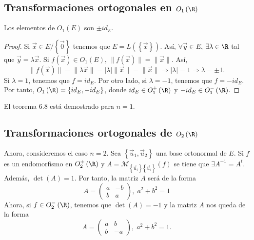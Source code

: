 \subsection{Transformaciones ortogonales en $\displaystyle O_{1}\left(\R\right) $}
\begin{ftheorem}[]
\normalfont Los elementos de $\displaystyle O_{1}\left(E\right) $ son $\displaystyle \pm id _{E} $.
\end{ftheorem}
\begin{proof}
Si $\displaystyle \vec{x} \in E/ \left\{ \vec{0}\right\}  $ tenemos que $\displaystyle E = L\left( \left\{ \vec{x}\right\} \right)$. Así, $\displaystyle \forall \vec{y} \in E $, $\displaystyle \exists \lambda \in \R $ tal que $\displaystyle \vec{y} = \lambda\vec{x} $. Si $\displaystyle f\left(\vec{x}\right) \in O_{1}\left(E\right) $, $\displaystyle \|f\left(\vec{x}\right)\| = \|\vec{x}\| $. Así,
	\[ \|f\left(\vec{x}\right)\| = \|\lambda \vec{x} \| = \left|\lambda \right|\|\vec{x}\| = \|\vec{x}\| \Rightarrow \left|\lambda \right|= 1 \Rightarrow \lambda = \pm 1 .\]
	Si $\displaystyle \lambda = 1 $, tenemos que $\displaystyle f = id _{E} $. Por otro lado, si $\displaystyle \lambda = - 1 $, tenemos que $\displaystyle f = - id _{E}$. Por tanto, $\displaystyle O_{1}\left(\R\right) = \left\{ id _{E}, - id _{E}\right\}  $, donde $\displaystyle id _{E} \in O^{+}_{1}\left(\R\right) $ y $\displaystyle -id _{E} \in O^{-}_{1}\left(\R\right) $.
\end{proof}
\begin{observation}
\normalfont El teorema 6.8 está demostrado para $\displaystyle n = 1 $.
\end{observation}
\subsection{Transformaciones ortogonales de $\displaystyle O_{2}\left(\R\right) $}
Ahora, consideremos el caso $\displaystyle n = 2 $. Sea $\displaystyle \left\{ \vec{u}_{1}, \vec{u}_{2}\right\}  $ una base ortonormal de $\displaystyle E $. Si $\displaystyle f $ es un endomorfismo en $\displaystyle O^{+}_{2}\left(\R\right) $ y $\displaystyle A = \mathcal{M}_{ \left\{ \vec{u}_{i}\right\} \left\{ \vec{u}_{i}\right\} }\left(f\right) $ se tiene que $\displaystyle \exists A^{-1} = A^{t} $. Además, $\displaystyle \det\left(A\right) = 1 $. Por tanto, la matriz $\displaystyle A $ será de la forma
	\[ A = \begin{pmatrix} a & - b \\ b & a\end{pmatrix} , \; a^{2} + b^{2} = 1\]
	Ahora, si $\displaystyle f \in O^{-}_{2}\left(\R\right) $, tenemos que $\displaystyle \det\left(A\right) = - 1 $ y la matriz $\displaystyle A $ nos queda de la forma
	\[ A = \begin{pmatrix} a & b \\ b & - a \end{pmatrix}, \; a^{2}+b^{2} = 1 .\]
